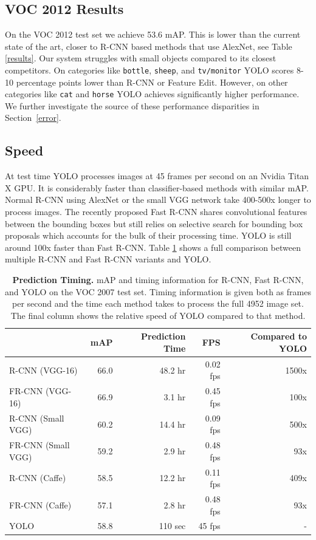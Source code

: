 \documentclass{article} %
\begin{document}
\subsection{VOC 2012 Results}

On the VOC 2012 test set we achieve 53.6 mAP. This is lower than the current state of the art, closer to R-CNN based methods that use AlexNet, see Table \ref{results}. Our system struggles with small objects compared to its closest competitors. On categories like \texttt{bottle}, \texttt{sheep}, and \texttt{tv/monitor} YOLO scores 8-10 percentage points lower than R-CNN or Feature Edit. However, on other categories like \texttt{cat} and \texttt{horse} YOLO achieves significantly higher performance. We further investigate the source of these performance disparities in Section~\ref{error}.

\subsection{Speed}

At test time YOLO processes images at 45 frames per second on an Nvidia Titan X GPU. It is considerably faster than classifier-based methods with similar mAP. Normal R-CNN using AlexNet or the small VGG network take 400-500x longer to process images. The recently proposed Fast R-CNN shares convolutional features between the bounding boxes but still relies on selective search for bounding box proposals which accounts for the bulk of their processing time. YOLO is still around 100x faster than Fast R-CNN. Table \ref{timing} shows a full comparison between multiple R-CNN and Fast R-CNN variants and YOLO.

\begin{table}[h]
\begin{center}
\begin{tabular}{lrrrr}
 & mAP & Prediction Time & FPS & Compared to YOLO\\
\hline
R-CNN (VGG-16) & 66.0 & 48.2 hr & 0.02 fps & 1500x \\
FR-CNN (VGG-16) & 66.9 & 3.1 hr & 0.45 fps & 100x \\
R-CNN (Small VGG) & 60.2 & 14.4 hr & 0.09 fps & 500x \\
FR-CNN (Small VGG) & 59.2 & 2.9 hr & 0.48 fps & 93x \\
R-CNN (Caffe) & 58.5 & 12.2 hr & 0.11 fps & 409x \\
FR-CNN (Caffe) & 57.1 & 2.8 hr & 0.48 fps & 93x \\
YOLO & 58.8 & 110 sec & 45 fps & - \\
\end{tabular}
\end{center}
\caption{\textbf{Prediction Timing.} mAP and timing information for R-CNN, Fast R-CNN, and YOLO on the VOC 2007 test set. Timing information is given both as frames per second and the time each method takes to process the full 4952 image set. The final column shows the relative speed of YOLO compared to that method.}
\label{timing}
\end{table}
\end{document}
